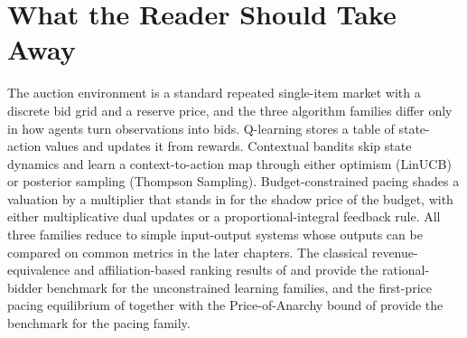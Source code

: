 \section{What the Reader Should Take Away}
\label{sec:ch3_summary}

The auction environment is a standard repeated single-item market with a discrete bid grid and a reserve price, and the three algorithm families differ only in how agents turn observations into bids. Q-learning stores a table of state-action values and updates it from rewards. Contextual bandits skip state dynamics and learn a context-to-action map through either optimism (LinUCB) or posterior sampling (Thompson Sampling). Budget-constrained pacing shades a valuation by a multiplier that stands in for the shadow price of the budget, with either multiplicative dual updates or a proportional-integral feedback rule. All three families reduce to simple input-output systems whose outputs can be compared on common metrics in the later chapters. The classical revenue-equivalence and affiliation-based ranking results of \citet{Vickrey1961} and \citet{MilgromWeber1982} provide the rational-bidder benchmark for the unconstrained learning families, and the first-price pacing equilibrium of \citet{Conitzer2022FPPE} together with the Price-of-Anarchy bound of \citet{Aggarwal2019} provide the benchmark for the pacing family.
